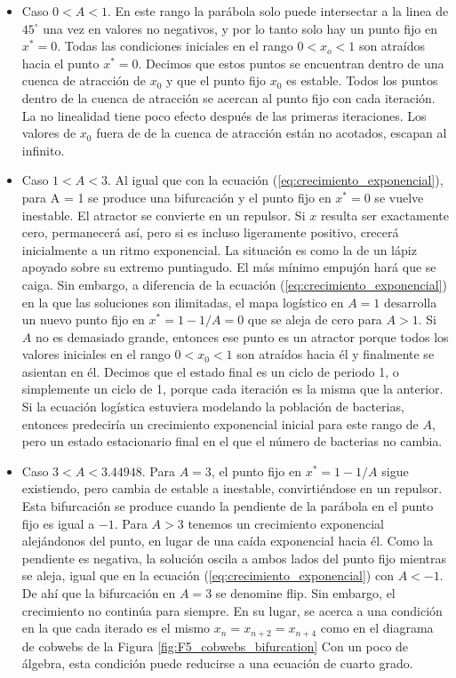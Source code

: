         \begin{itemize}
            \item Caso $0 < A < 1$.
                En este rango la parábola solo puede intersectar a la linea de $45^{\circ}$ una vez en valores no negativos, y por lo tanto solo hay un punto fijo en $x^{*} = 0$. Todas las condiciones iniciales en el rango $0 < x_{o} < 1$ son atraídos hacia el punto $x^{*} = 0$. Decimos que estos puntos se encuentran dentro de una cuenca de atracción de $x_{0}$ y que el punto fijo $x_{0}$ es estable. Todos los puntos dentro de la cuenca de atracción se acercan al punto fijo con cada iteración. La no linealidad tiene poco efecto después de las primeras iteraciones. Los valores de $x_{0}$ fuera de de la cuenca de atracción están no acotados, escapan al infinito.
            \item Caso $1 < A < 3$.
                Al igual que con la ecuación (\ref{eq:crecimiento_exponencial}), para A = 1 se produce una bifurcación y el punto fijo en $x^{*} = 0$ se vuelve inestable. El atractor se convierte en un repulsor. Si $x$ resulta ser exactamente cero, permanecerá así, pero si es incluso ligeramente positivo, crecerá inicialmente a un ritmo exponencial. La situación es como la de un lápiz apoyado sobre su extremo puntiagudo. El más mínimo empujón hará que se caiga. Sin embargo, a diferencia de la ecuación (\ref{eq:crecimiento_exponencial}) en la que las soluciones son ilimitadas, el mapa logístico en $A = 1 $ desarrolla un nuevo punto fijo en $x^{*} = 1- 1/A = 0$ que se aleja de cero para $A > 1$. Si $A$ no es demasiado grande, entonces ese punto es un atractor porque todos los valores iniciales en el rango $0 < x_{0} < 1$ son atraídos hacia él y finalmente se asientan en él. Decimos que el estado final es un ciclo de periodo 1, o simplemente un ciclo de 1, porque cada iteración es la misma que la anterior. Si la ecuación logística estuviera modelando la población de bacterias, entonces predeciría un crecimiento exponencial inicial para este rango de $A$, pero un estado estacionario final en el que el número de bacterias no cambia.
            \item Caso $3 < A < 3.44948$.
                Para $A = 3$, el punto fijo en $x^{*} = 1 - 1/A$ sigue existiendo, pero cambia de estable a inestable, convirtiéndose en un repulsor. Esta bifurcación se produce cuando la pendiente de la parábola en el punto fijo es igual a $-1$. Para $A > 3$ tenemos un crecimiento exponencial alejándonos del punto, en lugar de una caída exponencial hacia él. Como la pendiente es negativa, la solución oscila a ambos lados del punto fijo mientras se aleja, igual que en la ecuación (\ref{eq:crecimiento_exponencial}) con $ A < -1$. De ahí que la bifurcación en $A = 3$ se denomine flip. Sin embargo, el crecimiento no continúa para siempre. En su lugar, se acerca a una condición en la que cada iterado es el mismo $x_{n} = x_{n+2} = x_{n+4}$ como en el diagrama de cobwebs de la Figura \ref{fig:F5_cobwebs_bifurcation} Con un poco de álgebra, esta condición puede reducirse a una ecuación de cuarto grado.


\end{itemize}
